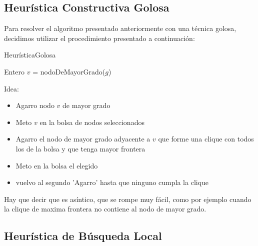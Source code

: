 \subsection{Heurística Constructiva Golosa}
Para resolver el algoritmo presentado anteriormente con una técnica golosa, decidimos utilizar el procedimiento presentado a continuación:\newline
\begin{algorithm}[H]
    \SetAlgoLined
    \caption{HeurísticaGolosa}
	Entero $v$ = nodoDeMayorGrado($g$)\\
\end{algorithm}
Idea:
\begin{itemize}
\item Agarro nodo $v$ de mayor grado
\item Meto $v$ en la bolsa de nodos seleccionados
\item Agarro el nodo de mayor grado adyacente a $v$ que forme una clique con todos los de la bolsa y que tenga mayor frontera
\item Meto en la bolsa el elegido
\item vuelvo al segundo 'Agarro' hasta que ninguno cumpla la clique
\end{itemize}


Hay que decir que es asíntico, que se rompe muy fácil, como por ejemplo cuando la clique de maxima frontera no contiene al nodo de mayor grado.

\subsection{Heurística de Búsqueda Local}

